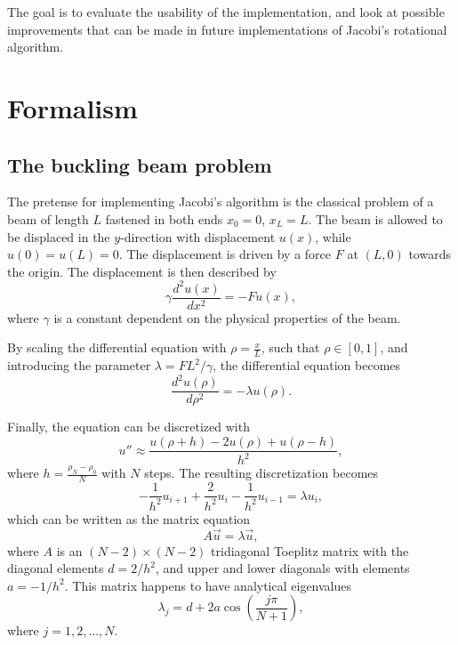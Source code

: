 \documentclass[english,notitlepage,reprint]{revtex4-1}  %
\begin{document}
The goal is to evaluate the usability of the implementation, and look at possible improvements that can be made in future implementations of Jacobi's rotational algorithm.

\section{Formalism}\label{sec:2}
\subsection{The buckling beam problem}\label{subsec:21}
The pretense for implementing Jacobi's algorithm is the classical problem of a beam of length \(L\) fastened in both ends \(x_{0} = 0\), \(x_{L} = L\). The beam is allowed to be displaced in the \(y\)-direction with displacement \(u(x)\), while \(u(0)=u(L)=0\). The displacement is driven by a force \(F\) at \((L,0)\) towards the origin. The displacement is then described by
$$
	\gamma \frac{d^{2}u(x)}{dx^{2}}=-Fu(x),
$$
where \(\gamma\) is a constant dependent on the physical properties of the beam\citep{DepartmentofPhysics2019}.

By scaling the differential equation with \(\rho = \frac{x}{L}\), such that \(\rho \in [0,1]\), and introducing the parameter \(\lambda = FL^{2}/\gamma\)\citep{DepartmentofPhysics2019}, the differential equation becomes
$$
	\frac{d^{2}u(\rho)}{d\rho^{2}}=-\lambda u(\rho).
$$

Finally, the equation can be discretized with
$$
	u'' \approx \frac{u(\rho+h)-2u(\rho)+u(\rho-h)}{h^{2}},
$$
where \(h = \frac{\rho_{N}-\rho_{0}}{N}\) with \(N\) steps\citep{DepartmentofPhysics2019}. The resulting discretization becomes
$$
	-\frac{1}{h^{2}}u_{i+1}+
	\frac{2}{h^{2}}u_{i}-\frac{1}{h^{2}}u_{i-1}=\lambda u_{i},
$$
which can be written as the matrix equation
$$
	A\vec{u}=\lambda\vec{u},
$$
where \(A\) is an \((N-2)\times (N-2)\) tridiagonal Toeplitz matrix with the diagonal elements \(d=2/h^{2}\), and upper and lower diagonals with elements \(a=-1/h^{2}\). This matrix happens to have analytical eigenvalues
$$
	\lambda_{j}=d+2a\cos\left(\frac{j\pi}{N+1}\right),
$$
where \(j=1,2,...,N\)\citep{DepartmentofPhysics2019}.
\end{document}
